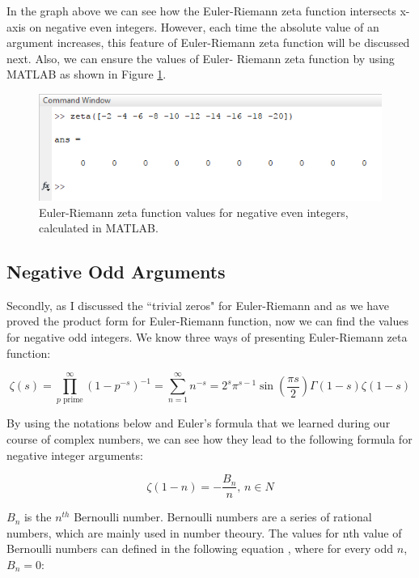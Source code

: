 \documentclass[11pt]{article}
\begin{document}
In the graph above we can see how the Euler-Riemann zeta function intersects
x-axis on negative even integers. However, each time the absolute value of an
argument increases, this feature of Euler-Riemann zeta function will be
discussed next. Also, we can ensure the values of Euler- Riemann zeta function
by using MATLAB as shown in Figure \ref{fig:org0ed39ad}. 

\begin{figure}[htbp]
\centering
\includegraphics[width=.9\linewidth]{./zerosv.png}
\caption{\label{fig:org0ed39ad}
Euler-Riemann zeta function values for negative even integers, calculated in MATLAB.}
\end{figure}

\subsection{Negative Odd Arguments}
\label{sec:org4aefaf5}

Secondly, as I discussed the “trivial zeros" for Euler-Riemann and as we have
proved the product form for Euler-Riemann function, now we can find the values
for negative odd integers. We know three ways of presenting Euler-Riemann zeta
function: 

\begin{equation}
  \zeta(s)=\prod_{p \text{ prime}}^{\infty} {(1-p^{-s})}^{-1}=\sum_{n=1}^{\infty} 
n^{-s}=2^s\pi^{s-1}\sin(\frac{\pi s}{2})\Gamma(1-s)\zeta(1-s)
  \end{equation}

By using the notations below and Euler's formula that we learned during our
course of complex numbers, we can see how they lead \cite{Bern} to the following
formula for negative integer arguments: 

\begin{equation}
  \label{bnn}
  \zeta(1-n)=-\frac{B_n}{n} \text{, $n\in N$}
  \end{equation}

\(B_n\) is the \(n^{th}\) Bernoulli number. Bernoulli numbers are a series of
rational numbers, which are mainly used in number theoury. The values for nth
value of Bernoulli numbers can defined in the following equation \cite{BernSeq},
where for every odd \(n\), \(B_n=0\):
\end{document}
